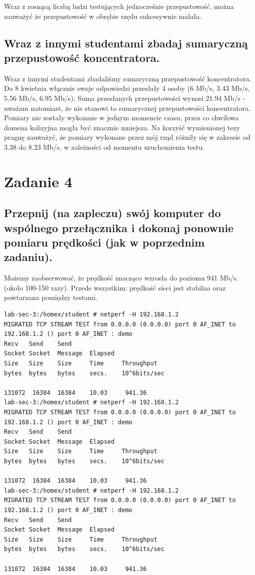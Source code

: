 \documentclass[polish, a4paper]{article}
\begin{document}
Wraz z rosnącą liczbą ludzi testujących jednocześnie przepustowość, można zauważyć że przepustowość w obrębie rzędu sukcesywnie malała.

\subsection{Wraz z innymi studentami zbadaj sumaryczną przepustowość
koncentratora.}

Wraz z innymi studentami zbadaliśmy sumaryczną przepustowość koncentratora. Do 8 kwietnia włącznie swoje odpowiedzi przesłały 4 osoby (6 Mb/s, 3.43 Mb/s, 5.56 Mb/s, 6.95 Mb/s). Suma przesłanych przepustowości wynosi 21.94 Mb/s - uważam natomiast, że nie stanowi to sumarycznej przepustowości koncentratora. Pomiary nie zostały wykonane w jednym momencie czasu, przez co chwilowa domena kolizyjna mogła być znacznie mniejsza. Na korzyść wymienionej tezy pragnę zauważyć, że pomiary wykonane przez mój rząd różniły się w zakresie od 3.38 do 8.23 Mb/s, w zależności od momentu uruchomienia testu.  

\section{Zadanie 4}
\subsection{Przepnij (na zapleczu) swój komputer do wspólnego
przełącznika i dokonaj ponownie pomiaru prędkości (jak w
poprzednim zadaniu).}

Możemy zaobserwować, że prędkość znacząco wzrosła do poziomu 941 Mb/s. (około 100-150 razy). Przede wszystkim: prędkość sieci jest stabilna oraz powtarzana pomiędzy testami.

\begin{verbatim}
lab-sec-3:/homex/student # netperf -H 192.168.1.2
MIGRATED TCP STREAM TEST from 0.0.0.0 (0.0.0.0) port 0 AF_INET to 192.168.1.2 () port 0 AF_INET : demo
Recv   Send    Send                          
Socket Socket  Message  Elapsed              
Size   Size    Size     Time     Throughput  
bytes  bytes   bytes    secs.    10^6bits/sec  

131072  16384  16384    10.03     941.36   
lab-sec-3:/homex/student # netperf -H 192.168.1.2
MIGRATED TCP STREAM TEST from 0.0.0.0 (0.0.0.0) port 0 AF_INET to 192.168.1.2 () port 0 AF_INET : demo
Recv   Send    Send                          
Socket Socket  Message  Elapsed              
Size   Size    Size     Time     Throughput  
bytes  bytes   bytes    secs.    10^6bits/sec  

131072  16384  16384    10.03     941.36   
lab-sec-3:/homex/student # netperf -H 192.168.1.2
MIGRATED TCP STREAM TEST from 0.0.0.0 (0.0.0.0) port 0 AF_INET to 192.168.1.2 () port 0 AF_INET : demo
Recv   Send    Send                          
Socket Socket  Message  Elapsed              
Size   Size    Size     Time     Throughput  
bytes  bytes   bytes    secs.    10^6bits/sec  

131072  16384  16384    10.03     941.36 
\end{verbatim}
\end{document}
